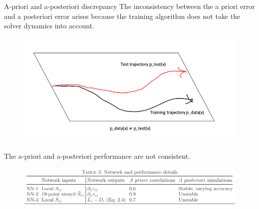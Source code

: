 \documentclass[paper slide]{beamer}
\begin{document}
\begin{frame}{A-priori and a-posteriori discrepancy}
	The inconsistency between the a priori error and a posteriori error arises because the {\color{red}training algorithm does not take the solver dynamics into account}.
	\begin{figure}
		\includegraphics[width=.6\textwidth]{fig/dilemma.png}
		\label{fig:dilemma}
	\end{figure}
	The a-priori and a-posteriori performance are not consistent.
	\begin{figure}
		\includegraphics[width=.8\textwidth]{fig/dichotomy.jpg}
		\label{fig:dichotomy}
	\end{figure}
\end{frame}
\end{document}
